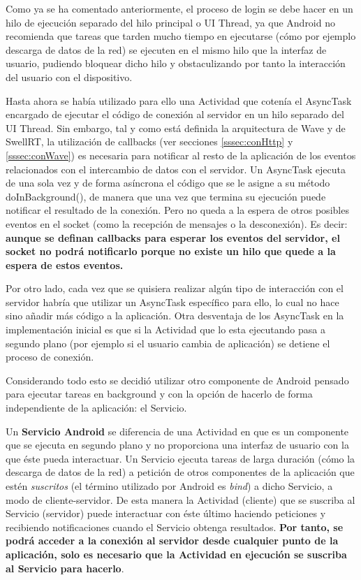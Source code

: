     Como ya se ha comentado anteriormente, el proceso de login se debe hacer en un hilo de ejecución separado del hilo principal o UI Thread, ya que Android no recomienda\cite{ref:android_processes} que tareas que tarden mucho tiempo en ejecutarse (cómo por ejemplo descarga de datos de la red) se ejecuten en el mismo hilo que la interfaz de usuario, pudiendo bloquear dicho hilo y obstaculizando por tanto la interacción del usuario con el dispositivo.
      
    Hasta ahora se había utilizado para ello una Actividad que cotenía el AsyncTask \cite{ref:android_asynctask} encargado de ejecutar el código de conexión al servidor en un hilo separado del UI Thread. Sin embargo, tal y como está definida la arquitectura de Wave y de SwellRT, la utilización de callbacks (ver secciones \ref{sssec:conHttp} y \ref{sssec:conWave}) es necesaria para notificar al resto de la aplicación de los eventos relacionados con el intercambio de datos con el servidor. Un AsyncTask ejecuta de una sola vez y de forma asíncrona el código que se le asigne a su método doInBackground(), de manera que una vez que termina su ejecución puede notificar el resultado de la conexión. Pero no queda a la espera de otros posibles eventos en el socket (como la recepción de mensajes o la desconexión). Es decir: \textbf{aunque se definan callbacks para esperar los eventos del servidor, el socket no podrá notificarlo porque no existe un hilo que quede a la espera de estos eventos.}

    Por otro lado, cada vez que se quisiera realizar algún tipo de interacción con el servidor habría que utilizar un AsyncTask específico para ello, lo cual no hace sino añadir más código a la aplicación. Otra desventaja de los AsyncTask en la implementación inicial es que si la Actividad que lo esta ejecutando pasa a segundo plano (por ejemplo si el usuario cambia de aplicación) se detiene el proceso de conexión. 

    Considerando todo esto se decidió utilizar otro componente de Android pensado para ejecutar tareas en background y con la opción de hacerlo de forma independiente de la aplicación: el Servicio\cite{ref:android_service}.

    Un \textbf{Servicio Android} se diferencia de una Actividad en que es un componente que se ejecuta en segundo plano y no proporciona una interfaz de usuario con la que éste pueda interactuar. Un Servicio ejecuta tareas de larga duración (cómo la descarga de datos de la red) a petición de otros componentes de la aplicación que estén \textit{suscritos} (el término utilizado por Android es \textit{bind}) a dicho Servicio, a modo de cliente-servidor. De esta manera la Actividad (cliente) que se suscriba al Servicio (servidor) puede interactuar con éste último haciendo peticiones y recibiendo notificaciones cuando el Servicio obtenga resultados. \textbf{Por tanto, se podrá acceder a la conexión al servidor desde cualquier punto de la aplicación, solo es necesario que la Actividad en ejecución se suscriba al Servicio para hacerlo}. 
    
